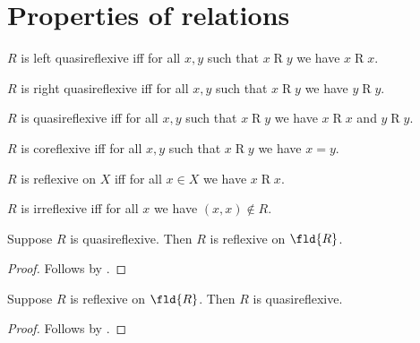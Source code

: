 


\section{Properties of relations}

\begin{definition}\label{left_quasireflexive}
    $R$ is left quasireflexive iff
    for all $x, y$ such that $x\mathrel{R} y$
    we have $x\mathrel{R}x$.
\end{definition}

\begin{definition}\label{right_quasireflexive}
    $R$ is right quasireflexive iff
    for all $x, y$ such that $x\mathrel{R} y$
    we have $y\mathrel{R}y$.
\end{definition}

\begin{definition}\label{quasireflexive}
    $R$ is quasireflexive iff
    for all $x, y$ such that $x\mathrel{R} y$
    we have $x\mathrel{R}x$ and $y\mathrel{R}y$.
\end{definition}

\begin{definition}\label{coreflexive}
    $R$ is coreflexive iff
    for all $x, y$ such that $x\mathrel{R} y$
    we have $x = y$.
\end{definition}

\begin{definition}\label{reflexive_on}
    $R$ is reflexive on $X$ iff
    for all $x\in X$
    we have $x\mathrel{R}x$.
\end{definition}

\begin{definition}\label{irreflexive}
    $R$ is irreflexive iff
    for all $x$ we have $(x,x)\notin R$.
\end{definition}


\begin{proposition}\label{quasireflexive_implies_reflexive_on_fld}
    Suppose $R$ is quasireflexive.
    Then $R$ is reflexive on $\fld{R}$.
\end{proposition}
\begin{proof}
    Follows by .
\end{proof}

\begin{proposition}\label{reflexive_on_fld_impliesquasireflexive}
    Suppose $R$ is reflexive on $\fld{R}$.
    Then $R$ is quasireflexive.
\end{proposition}
\begin{proof}
    Follows by .
\end{proof}

